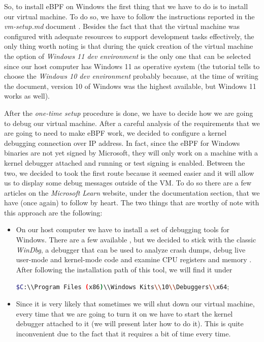 So, to install eBPF on Windows the first thing that we have to do is to install our virtual machine.
To do so, we have to follow the instructions reported in the \textit{vm-setup.md} document \cite{WinVMSetupDoc}.
Besides the fact that that the virtual machine was configured with adequate resources to support development tasks effectively, the only thing worth noting is that during the quick creation of the virtual machine the option of \textit{Windows 11 dev environment} is the only one that can be selected since our host computer has Windows 11 as operative system (the tutorial tells to choose the \textit{Windows 10 dev environment} probably because, at the time of writing the document, version 10 of Windows was the highest available, but Windows 11 works as well).  

After the \textit{one-time setup} procedure is done, we have to decide how we are going to debug our virtual machine.
After a careful analysis of the requirements that we are going to need to make eBPF work, we decided to configure a kernel debugging connection over IP address.
In fact, since the eBPF for Windows binaries are not yet signed by Microsoft, they will only work on a machine with a kernel debugger attached and running or test signing is enabled.
Between the two, we decided to took the first route because it seemed easier and it will allow us to display some debug messages outside of the VM.
To do so there are a few articles on the \textit{Microsoft Learn} website, under the documentation section, that we have (once again) to follow by heart.
The two things that are worthy of note with this approach are the following:

\begin{itemize}
	\item 
		On our host computer we have to install a set of debugging tools for Windows.
		There are a few available \cite{DbgToolsWin}, but we decided to stick with the classic \textit{WinDbg}, a debugger that can be used to analyze crash dumps, debug live user-mode and kernel-mode code and examine CPU registers and memory \cite{InstallWinDbg}.
		After following the installation path of this tool, we will find it under \raggedright\colorbox{backcolour}{\lstinline[style=commandline, language=bash]|$C:\\Program Files (x86)\\Windows Kits\\10\\Debuggers\\x64|};
	\item 
		Since it is very likely that sometimes we will shut down our virtual machine, every time that we are going to turn it on we have to start the kernel debugger attached to it (we will present later how to do it).
		This is quite inconvenient due to the fact that it requires a bit of time every time.  
\end{itemize}

